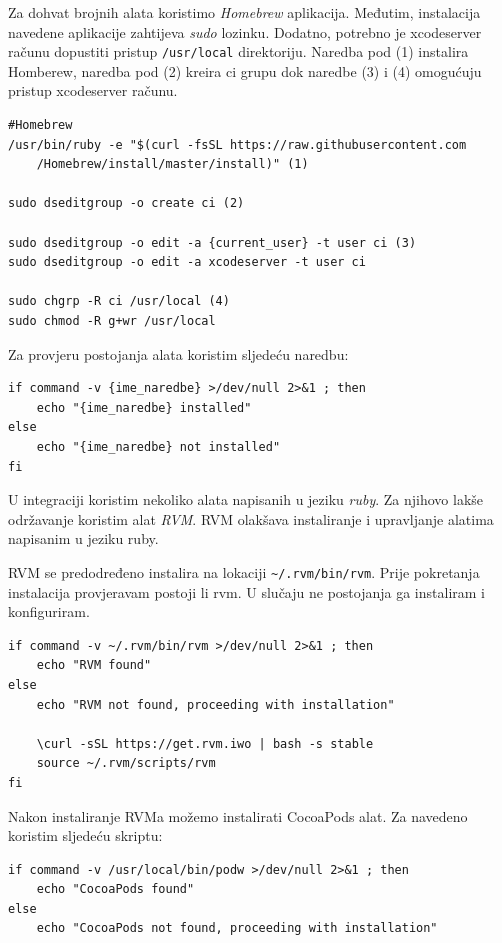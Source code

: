 \documentclass[times, utf8, diplomski, numeric]{fer}
\begin{document}
\begin{appendices}
Za dohvat brojnih alata koristimo \textit{Homebrew} aplikacija. Međutim, instalacija navedene aplikacije zahtijeva \textit{sudo} lozinku. Dodatno, potrebno je xcodeserver računu dopustiti pristup \verb|/usr/local| direktoriju. Naredba pod (1) instalira Homberew, naredba pod (2) kreira ci grupu dok naredbe (3) i (4) omogućuju pristup xcodeserver računu.

\begin{verbatim}
#Homebrew
/usr/bin/ruby -e "$(curl -fsSL https://raw.githubusercontent.com
    /Homebrew/install/master/install)" (1)

sudo dseditgroup -o create ci (2)

sudo dseditgroup -o edit -a {current_user} -t user ci (3)
sudo dseditgroup -o edit -a xcodeserver -t user ci

sudo chgrp -R ci /usr/local (4)
sudo chmod -R g+wr /usr/local

\end{verbatim}

Za provjeru postojanja alata koristim sljedeću naredbu:

\begin{verbatim}
if command -v {ime_naredbe} >/dev/null 2>&1 ; then
    echo "{ime_naredbe} installed"
else
    echo "{ime_naredbe} not installed"
fi
\end{verbatim}

U integraciji koristim nekoliko alata napisanih u jeziku \textit{ruby}. Za njihovo lakše održavanje koristim alat \textit{RVM}. RVM olakšava instaliranje i upravljanje alatima napisanim u jeziku ruby.

RVM se predodređeno instalira na lokaciji \verb|~/.rvm/bin/rvm|. Prije pokretanja instalacija provjeravam postoji li rvm. U slučaju ne postojanja ga instaliram i konfiguriram.

\begin{verbatim}
if command -v ~/.rvm/bin/rvm >/dev/null 2>&1 ; then
    echo "RVM found"
else
    echo "RVM not found, proceeding with installation"

    \curl -sSL https://get.rvm.iwo | bash -s stable
    source ~/.rvm/scripts/rvm
fi
\end{verbatim}

Nakon instaliranje RVMa možemo instalirati CocoaPods alat. Za navedeno koristim sljedeću skriptu:

\begin{verbatim}
if command -v /usr/local/bin/podw >/dev/null 2>&1 ; then
    echo "CocoaPods found"
else
    echo "CocoaPods not found, proceeding with installation"


\end{verbatim}
\end{appendices}
\end{document}
